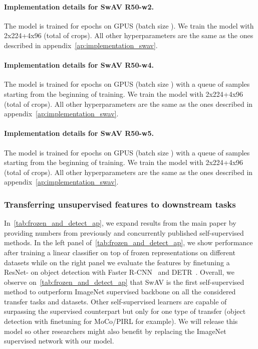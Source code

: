 \documentclass{article}
\def\OURS{SwAV\xspace}
\newcommand{\resnetfifty}{R50}
\begin{document}
\paragraph{Implementation details for SwAV \resnetfifty-w2.}
The model is trained for  epochs on  GPUS (batch size ).
We train the model with 2x224+4x96 (total of  crops).
All other hyperparameters are the same as the ones described in appendix~\ref{ap:implementation_swav}.

\paragraph{Implementation details for SwAV \resnetfifty-w4.}
The model is trained for  epochs on  GPUS (batch size ) with a queue of  samples starting from the beginning of training.
We train the model with 2x224+4x96 (total of  crops).
All other hyperparameters are the same as the ones described in appendix~\ref{ap:implementation_swav}.

\paragraph{Implementation details for SwAV \resnetfifty-w5.}
The model is trained for  epochs on  GPUS (batch size ) with a queue of  samples starting from the beginning of training.
We train the model with 2x224+4x96 (total of  crops).
All other hyperparameters are the same as the ones described in appendix~\ref{ap:implementation_swav}.

\subsubsection{Transferring unsupervised features to downstream tasks}
In~\cref{tab:frozen_and_detect_ap}, we expand results from the main paper by providing numbers from previously and concurrently published self-supervised methods.
In the left panel of~\cref{tab:frozen_and_detect_ap}, we show performance after training a linear classifier on top of frozen representations on different datasets while on the right panel we evaluate the features by finetuning a ResNet- on object detection with Faster R-CNN~\cite{ren2015faster} and DETR~\cite{carion2020end}.
Overall, we observe on~\cref{tab:frozen_and_detect_ap} that \OURS is the first self-supervised method to outperform ImageNet supervised backbone on all the considered transfer tasks and datasets.
Other self-supervised learners are capable of surpassing the supervised counterpart but only for one type of transfer (object detection with finetuning for MoCo/PIRL for example).
We will release this model so other researchers might also benefit by replacing the ImageNet supervised network with our model.
\end{document}

